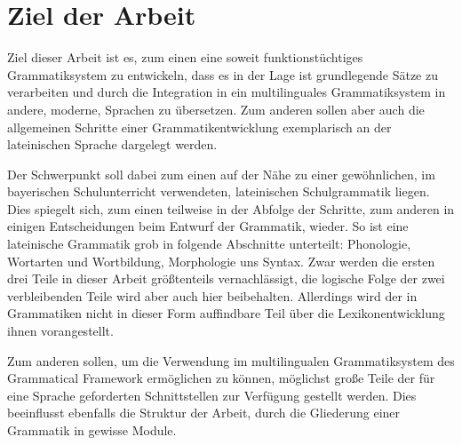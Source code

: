 \section{Ziel der Arbeit}
\label{sec:ziel}
Ziel dieser Arbeit ist es, zum einen eine soweit funktionstüchtiges Grammatiksystem zu entwickeln, dass es in der Lage ist grundlegende Sätze zu verarbeiten und durch die Integration in ein multilinguales Grammatiksystem in andere, moderne, Sprachen zu übersetzen. Zum anderen sollen aber auch die allgemeinen Schritte einer Grammatikentwicklung exemplarisch an der lateinischen Sprache dargelegt werden. \par
Der Schwerpunkt soll dabei zum einen auf der Nähe zu einer gewöhnlichen, im bayerischen Schulunterricht verwendeten, lateinischen Schulgrammatik liegen. Dies spiegelt sich, zum einen teilweise in der Abfolge der Schritte, zum anderen in einigen Entscheidungen beim Entwurf der Grammatik, wieder. So ist eine lateinische Grammatik grob in folgende Abschnitte unterteilt: Phonologie, Wortarten und Wortbildung, Morphologie uns Syntax. Zwar werden die ersten drei Teile in dieser Arbeit größtenteils vernachlässigt, die logische Folge der zwei verbleibenden Teile wird aber auch hier beibehalten. Allerdings wird der in Grammatiken nicht in dieser Form auffindbare Teil über die Lexikonentwicklung ihnen vorangestellt. \par
Zum anderen sollen, um die Verwendung im multilingualen Grammatiksystem des Grammatical Framework ermöglichen zu können, möglichst große Teile der für eine Sprache geforderten Schnittstellen zur Verfügung gestellt werden. Dies beeinflusst ebenfalls die Struktur der Arbeit, durch die Gliederung einer Grammatik in gewisse Module. 
\pagebreak
